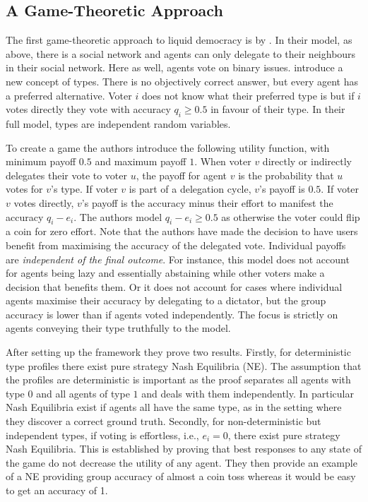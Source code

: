 \documentclass[11pt,a4paper, titlepage]{article}
\theoremstyle{definition}
\begin{document}
\subsection{A Game-Theoretic Approach}

The first game-theoretic approach to liquid democracy is by \citet{bloembergen2019rational}.
In their model, as above, there is a social network and agents can only delegate to their neighbours in their social network. Here as well, agents vote on binary issues.
\citeauthor{bloembergen2019rational} introduce a new concept of types. 
There is no objectively correct answer, but every agent has a preferred alternative.
Voter $i$ does not know what their preferred type is but if $i$ votes directly they vote with accuracy $q_i \geq 0.5$ in favour of their type.
In their full model, types are independent random variables.

To create a game the authors introduce the following utility function, with minimum payoff $0.5$ and maximum payoff $1$.
When voter $v$ directly or indirectly delegates their vote to voter $u$, the payoff for agent $v$ is the probability that $u$ votes for $v$'s type.
If voter $v$ is part of a delegation cycle, $v$'s payoff is $0.5$.
If voter $v$ votes directly, $v$'s payoff is the accuracy minus their effort to manifest the accuracy $q_i - e_i$.
The authors model $q_i - e_i \geq 0.5$ as otherwise the voter could flip a coin for zero effort.
Note that the authors have made the decision to have users benefit from maximising the accuracy of the delegated vote.
Individual payoffs are \emph{independent of the final outcome}.
For instance, this model does not account for agents being lazy and essentially abstaining while other voters make a decision that benefits them.
Or it does not account for cases where individual agents maximise their accuracy by delegating to a dictator, but the group accuracy is lower than if agents voted independently.
The focus is strictly on agents conveying their type truthfully to the model.

After setting up the framework they prove two results. 
Firstly, for deterministic type profiles there exist pure strategy Nash Equilibria (NE).
The assumption that the profiles are deterministic is important as the proof separates all agents with type $0$ and all agents of type $1$ and deals with them independently.
In particular Nash Equilibria exist if agents all have the same type, as in the setting where they discover a correct ground truth.
Secondly, for non-deterministic but independent types, if voting is effortless, i.e., $e_i = 0$, there exist pure strategy Nash Equilibria.
This is established by proving that best responses to any state of the game do not decrease the utility of any agent.
They then provide an example of a NE providing group accuracy of almost a coin toss whereas it would be easy to get an accuracy of 1. 
\end{document}
